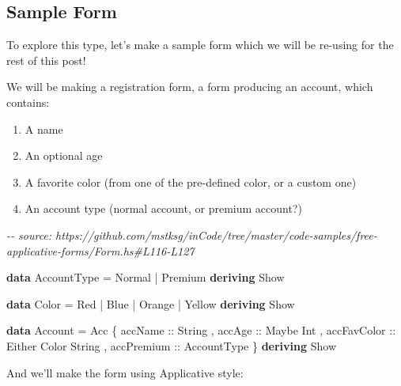 \documentclass[]{article}
\newenvironment{Shaded}{}{}
\newcommand{\CommentTok}[1]{\textcolor[rgb]{0.38,0.63,0.69}{\textit{#1}}}
\newcommand{\DataTypeTok}[1]{\textcolor[rgb]{0.56,0.13,0.00}{#1}}
\newcommand{\KeywordTok}[1]{\textcolor[rgb]{0.00,0.44,0.13}{\textbf{#1}}}
\newcommand{\NormalTok}[1]{#1}
\newcommand{\OperatorTok}[1]{\textcolor[rgb]{0.40,0.40,0.40}{#1}}
\newcommand{\OtherTok}[1]{\textcolor[rgb]{0.00,0.44,0.13}{#1}}
\begin{document}
\hypertarget{sample-form}{%
\subsection{Sample Form}\label{sample-form}}

To explore this type, let's make a sample form which we will be re-using for the
rest of this post!

We will be making a registration form, a form producing an account, which
contains:

\begin{enumerate}
\def\labelenumi{\arabic{enumi}.}
\tightlist
\item
  A name
\item
  An optional age
\item
  A favorite color (from one of the pre-defined color, or a custom one)
\item
  An account type (normal account, or premium account?)
\end{enumerate}

\begin{Shaded}
\begin{Highlighting}[]
\CommentTok{{-}{-} source: https://github.com/mstksg/inCode/tree/master/code{-}samples/free{-}applicative{-}forms/Form.hs\#L116{-}L127}

\KeywordTok{data} \DataTypeTok{AccountType} \OtherTok{=} \DataTypeTok{Normal} \OperatorTok{|} \DataTypeTok{Premium}
    \KeywordTok{deriving} \DataTypeTok{Show}

\KeywordTok{data} \DataTypeTok{Color} \OtherTok{=} \DataTypeTok{Red} \OperatorTok{|} \DataTypeTok{Blue} \OperatorTok{|} \DataTypeTok{Orange} \OperatorTok{|} \DataTypeTok{Yellow}
    \KeywordTok{deriving} \DataTypeTok{Show}

\KeywordTok{data} \DataTypeTok{Account} \OtherTok{=} \DataTypeTok{Acc}\NormalTok{ \{}\OtherTok{ accName     ::} \DataTypeTok{String}
\NormalTok{                   ,}\OtherTok{ accAge      ::} \DataTypeTok{Maybe} \DataTypeTok{Int}
\NormalTok{                   ,}\OtherTok{ accFavColor ::} \DataTypeTok{Either} \DataTypeTok{Color} \DataTypeTok{String}
\NormalTok{                   ,}\OtherTok{ accPremium  ::} \DataTypeTok{AccountType}
\NormalTok{                   \}}
    \KeywordTok{deriving} \DataTypeTok{Show}
\end{Highlighting}
\end{Shaded}

And we'll make the form using Applicative style:
\end{document}
